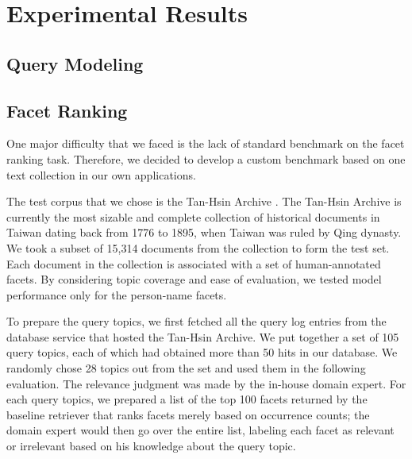 \section{Experimental Results}\label{s:experimental-results}

\subsection{Query Modeling}

\subsection{Facet Ranking}

One major difficulty that we faced is the lack of standard benchmark on the
facet ranking task.  Therefore, we decided to develop a custom benchmark based
on one text collection in our own applications.  

The test corpus that we chose is the Tan-Hsin Archive .  The
Tan-Hsin Archive is currently the most sizable and complete collection of
historical documents in Taiwan dating back from 1776 to 1895, when Taiwan was
ruled by Qing dynasty.  We took a subset of 15,314 documents from the
collection to form the test set.  Each document in the collection is associated
with a set of human-annotated facets.  By considering topic coverage and ease
of evaluation, we tested model performance only for the person-name facets.

To prepare the query topics, we first fetched all the query log entries from
the database service that hosted the Tan-Hsin Archive.  We put together a set
of 105 query topics, each of which had obtained more than 50 hits in our
database.  We randomly chose 28 topics out from the set and used them in the
following evaluation.  The relevance judgment was made by the in-house domain
expert.  For each query topics, we prepared a list of the top 100 facets
returned by the baseline retriever that ranks facets merely based on occurrence
counts; the domain expert would then go over the entire list, labeling each
facet as relevant or irrelevant based on his knowledge about the query topic.

